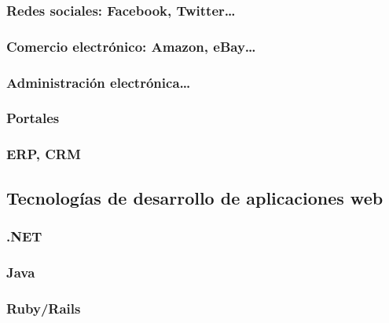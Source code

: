 \documentclass[a4paper,11pt,spanish]{sphinxmanual}
\begin{document}
\subsubsection{Redes sociales: Facebook, Twitter…}
\label{\detokenize{introduccion:redes-sociales-facebook-twitter}}

\subsubsection{Comercio electrónico: Amazon, eBay…}
\label{\detokenize{introduccion:comercio-electronico-amazon-ebay}}

\subsubsection{Administración electrónica…}
\label{\detokenize{introduccion:administracion-electronica}}

\subsubsection{Portales}
\label{\detokenize{introduccion:portales}}

\subsubsection{ERP, CRM}
\label{\detokenize{introduccion:erp-crm}}

\subsection{Tecnologías de desarrollo de aplicaciones web}
\label{\detokenize{introduccion:tecnologias-de-desarrollo-de-aplicaciones-web}}

\subsubsection{.NET}
\label{\detokenize{introduccion:net}}

\subsubsection{Java}
\label{\detokenize{introduccion:java}}

\subsubsection{Ruby/Rails}
\label{\detokenize{introduccion:ruby-rails}}
\end{document}
